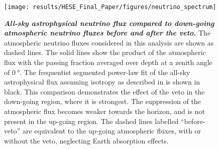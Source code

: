 \begin{figure}
	\centering
	\texttt{[image: results/HESE\_Final\_Paper/figures/neutrino\_spectrum]}
	\internallinenumbers
	\caption{\textbf{\textit{All-sky astrophysical neutrino flux compared to down-going atmospheric neutrino fluxes before and after the veto.}}
		The atmospheric neutrino fluxes considered in this analysis are shown as dashed lines.
		The solid lines show the product of the atmospheric flux with the passing fraction averaged over depth at a zenith angle of $\SI{0}\degree$.
		The frequentist segmented power-law fit of the all-sky astrophysical flux assuming isotropy as described in  is shown in black.
		This comparison demonstrates the effect of the veto in the down-going region, where it is strongest.
		The suppression of the atmospheric flux becomes weaker towards the horizon, and is not present in the up-going region.
		The dashed lines labelled ``before-veto'' are equivalent to the up-going atmospheric fluxes, with or without the veto, neglecting Earth absorption effects.}
	\label{fig:neutrino_spectrum}
\end{figure}

